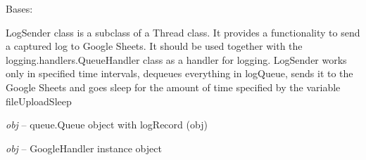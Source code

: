 \documentclass[letterpaper,10pt,english]{sphinxmanual}
\begin{document}
\begin{fulllineitems}
\label{rpicameramon:rpicameramon.telemetry.LogSender}
Bases: 

LogSender class is a subclass of a Thread class.
It provides a functionality to send a captured log to
Google Sheets. It should be used together with the
logging.handlers.QueueHandler class as a handler for logging.
LogSender works only in specified time intervals,
dequeues everything in logQueue, sends it
to the Google Sheets and goes sleep for the amount of time
specified by the variable fileUploadSleep

\begin{fulllineitems}
\label{rpicameramon:rpicameramon.telemetry.LogSender.logQueue}
\emph{obj} -- queue.Queue object with logRecord (obj)

\end{fulllineitems}


\begin{fulllineitems}
\label{rpicameramon:rpicameramon.telemetry.LogSender.enqueued}
\end{fulllineitems}


\begin{fulllineitems}
\label{rpicameramon:rpicameramon.telemetry.LogSender.googleHandler}
\emph{obj} -- GoogleHandler instance object

\end{fulllineitems}


\begin{fulllineitems}
\label{rpicameramon:rpicameramon.telemetry.LogSender.run}
\end{fulllineitems}


\end{fulllineitems}

\end{document}
